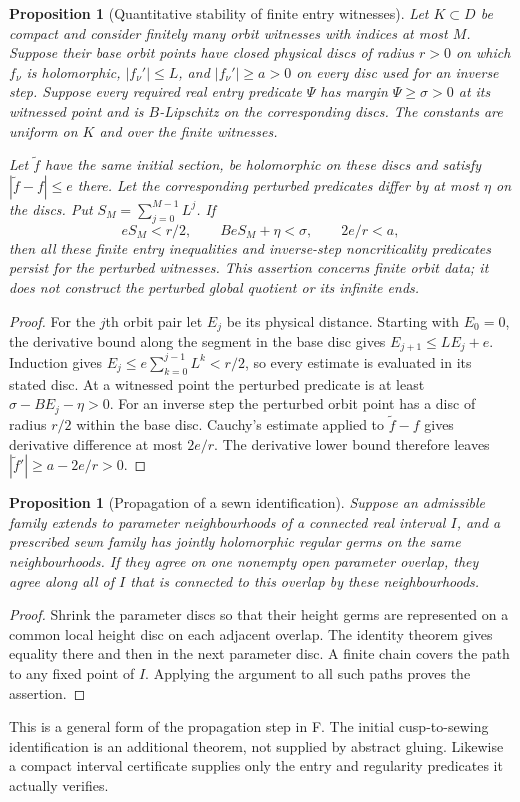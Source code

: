 \documentclass[11pt]{article}
\newtheorem{proposition}[theorem]{Proposition}
\begin{document}
\begin{proposition}[Quantitative stability of finite entry witnesses]
\label{prop:finite-witness-stability}
Let $K\subset D$ be compact and consider finitely many orbit witnesses
with indices at most $M$. Suppose their base orbit points have closed
physical discs of radius $r>0$ on which $f_\nu$ is holomorphic,
$|f_\nu'|\le L$, and $|f_\nu'|\ge a>0$ on every disc used for an inverse
step. Suppose every required real entry predicate $\Psi$ has margin
$\Psi\ge\sigma>0$ at its witnessed point and is $B$-Lipschitz on the
corresponding discs. The constants are uniform on $K$ and over the
finite witnesses.

Let $\widetilde f$ have the same initial section, be holomorphic on
these discs and satisfy $|\widetilde f-f|\le e$ there. Let the corresponding
perturbed predicates differ by at most $\eta$ on the discs. Put
$S_M=\sum_{j=0}^{M-1}L^j$. If
\[
 eS_M<r/2,\qquad BeS_M+\eta<\sigma,\qquad 2e/r<a,
\]
then all these finite entry inequalities and inverse-step
noncriticality predicates persist for the perturbed witnesses.
This assertion concerns finite orbit data; it does not construct the
perturbed global quotient or its infinite ends.
\end{proposition}
\begin{proof}
For the $j$th orbit pair let $E_j$ be its physical distance. Starting
with $E_0=0$, the derivative bound along the segment in the base disc
gives $E_{j+1}\le LE_j+e$. Induction gives
$E_j\le e\sum_{k=0}^{j-1}L^k<r/2$, so every estimate is evaluated in
its stated disc. At a witnessed point the perturbed predicate is at
least $\sigma-BE_j-\eta>0$. For an inverse step the perturbed orbit
point has a disc of radius $r/2$ within the base disc. Cauchy's estimate
applied to $\widetilde f-f$ gives derivative difference at most $2e/r$.
The derivative lower bound therefore leaves
$|\widetilde f'|\ge a-2e/r>0$.
\end{proof}

\begin{proposition}[Propagation of a sewn identification]
\label{prop:general-sewn}
Suppose an admissible family extends to parameter neighbourhoods of a
connected real interval $I$, and a prescribed sewn family has jointly
holomorphic regular germs on the same neighbourhoods. If they agree on
one nonempty open parameter overlap, they agree along all of $I$ that
is connected to this overlap by these neighbourhoods.
\end{proposition}
\begin{proof}
Shrink the parameter discs so that their height germs are represented
on a common local height disc on each adjacent overlap. The identity
theorem gives equality there and then in the next parameter disc.
A finite chain covers the path to any fixed point of $I$. Applying the
argument to all such paths proves the assertion.
\end{proof}
This is a general form of the propagation step in F. The initial
cusp-to-sewing identification is an additional theorem, not supplied
by abstract gluing. Likewise a compact interval certificate supplies
only the entry and regularity predicates it actually verifies.
\end{document}
